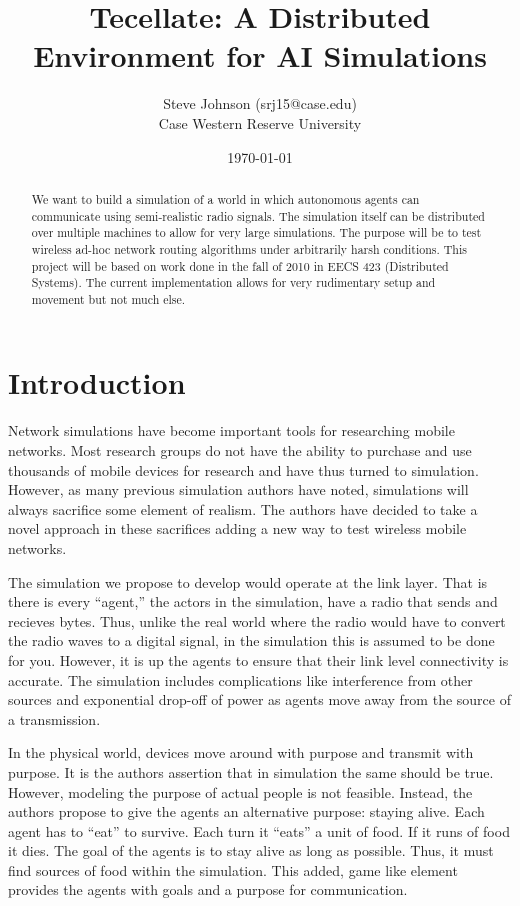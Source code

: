 \documentclass[12pt]{article}
\title{Tecellate: A Distributed Environment for AI Simulations}
\author{
        Steve Johnson (srj15@case.edu)\\
        Case Western Reserve University\\
}
\date{\today}
\begin{document}
\doublespacing
\maketitle


\begin{abstract}
    We want to build a simulation of a world in which autonomous agents can communicate using semi-realistic radio signals. The simulation itself can be distributed over multiple machines to allow for very large simulations. The purpose will be to test wireless ad-hoc network routing algorithms under arbitrarily harsh conditions.
    This project will be based on work done in the fall of 2010 in EECS 423 (Distributed Systems). The current implementation allows for very rudimentary setup and movement but not much else.
\end{abstract}

\section{Introduction}

Network simulations have become important tools for researching mobile networks. Most research groups do not have the ability to purchase and use thousands of mobile devices for research and have thus turned to simulation. However, as many previous simulation authors have noted, simulations will always sacrifice some element of realism. The authors have decided to take a novel approach in these sacrifices adding a new way to test wireless mobile networks.

The simulation we propose to develop would operate at the link layer. That is there is every ``agent,'' the actors in the simulation, have a radio that sends and recieves bytes. Thus, unlike the real world where the radio would have to convert the radio waves to a digital signal, in the simulation this is assumed to be done for you. However, it is up the agents to ensure that their link level connectivity is accurate. The simulation includes complications like interference from other sources and exponential drop-off of power as agents move away from the source of a transmission.

In the physical world, devices move around with purpose and transmit with purpose. It is the authors assertion that in simulation the same should be true. However, modeling the purpose of actual people is not feasible. Instead, the authors propose to give the agents an alternative purpose: staying alive. Each agent has to ``eat'' to survive. Each turn it ``eats'' a unit of food. If it runs of food it dies. The goal of the agents is to stay alive as long as possible. Thus, it must find sources of food within the simulation. This added, game like element provides the agents with goals and a purpose for communication.
\end{document}
